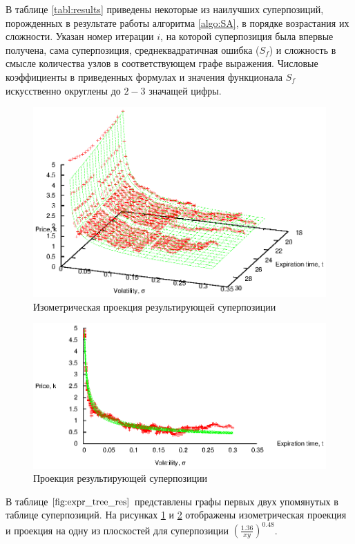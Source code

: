 \documentclass[12pt,a4paper]{article}
\begin{document}
В таблице \ref{tabl:results} приведены некоторые из наилучших суперпозиций,
порожденных в результате работы алгоритма \ref{algo:SA}, в порядке возрастания
их сложности. Указан номер итерации $i$, на которой суперпозиция была впервые
получена, сама суперпозиция, среднеквадратичная ошибка ($S_f$) и сложность в
смысле количества узлов в соответствующем графе выражения. Числовые коэффициенты
в приведенных формулах и значения функционала $S_f$ искусственно округлены до
$2-3$ значащей цифры.

\begin{figure}[h]
  \includegraphics[scale=1.1]{figs/1-iso.eps}
  \caption{Изометрическая проекция результирующей суперпозиции}
  \label{fig:1_iso}
\end{figure}

\begin{figure}[h]
  \includegraphics[scale=1.1]{figs/1-proj.eps}
  \caption{Проекция результирующей суперпозиции}
  \label{fig:1_proj}
\end{figure}

В таблице $\ref{fig:expr_tree_res}$ представлены графы
первых двух упомянутых в таблице суперпозиций. На рисунках \ref{fig:1_iso} и
\ref{fig:1_proj} отображены изометрическая проекция и проекция на одну из
плоскостей для суперпозиции $\left(\frac{1.36}{xy}\right)^{0.48}$. 
\end{document}
